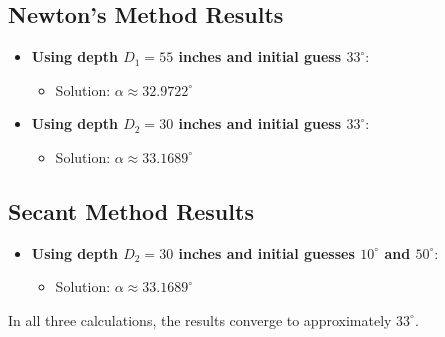 \documentclass[a4paper]{article}
\begin{document}
\subsection{Newton's Method Results}
\begin{itemize}
    \item \textbf{Using depth \( D_1 = 55 \) inches and initial guess \( 33^\circ \)}:
    \begin{itemize}
        \item Solution: \( \alpha \approx 32.9722^\circ \)
    \end{itemize}
    
    \item \textbf{Using depth \( D_2 = 30 \) inches and initial guess \( 33^\circ \)}:
    \begin{itemize}
        \item Solution: \( \alpha \approx 33.1689^\circ \)
    \end{itemize}
\end{itemize}

\subsection{Secant Method Results}
\begin{itemize}
    \item \textbf{Using depth \( D_2 = 30 \) inches and initial guesses \( 10^\circ \) and \( 50^\circ \)}:
    \begin{itemize}
        \item Solution: \( \alpha \approx 33.1689^\circ \)
    \end{itemize}
\end{itemize}

In all three calculations, the results converge to approximately \( 33^\circ \).

\end{document}
